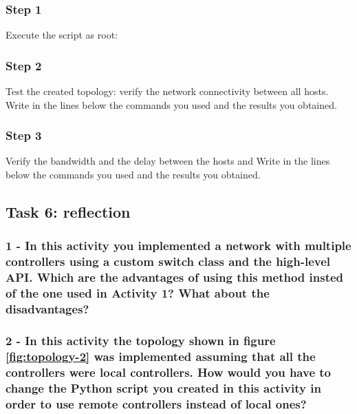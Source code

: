 \subsubsection*{Step 1}
Execute the script as root: \\

\subsubsection*{Step 2}
Test the created topology: verify the network connectivity between all hosts.
Write in the lines below the commands you used and the results you obtained.

\hrulefill

\hrulefill

\hrulefill

\hrulefill

\subsubsection*{Step 3}
Verify the bandwidth and the delay between the hosts  and 
Write in the lines below the commands you used and the results you obtained.

\hrulefill

\hrulefill

\hrulefill

\hrulefill





\subsection*{Task 6: reflection}
\subsubsection*{1 - In this activity you implemented a network with multiple
controllers using a custom switch class and the high-level API. Which are
the advantages of using this method insted of the one used in Activity 1? What
about the disadvantages?}
\hrulefill

\hrulefill

\hrulefill

\hrulefill


\subsubsection*{2 - In this activity the topology shown in figure \ref{fig:topology-2}
was implemented assuming that all the controllers were local controllers. How would
you have to change the Python script you created in this activity in order
to use remote controllers instead of local ones?}
\hrulefill

